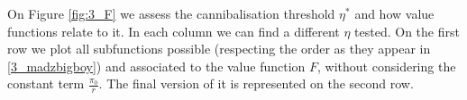 On Figure \ref{fig:3_F} we assess the cannibalisation threshold $\eta^*$ and how value functions relate to it. In each column we can find a different $\eta$ tested. On the first row we plot all subfunctions possible (respecting the order as they appear in \eqref{3_madzbigboy}) and associated to the value function $F$, without considering the constant term $\frac{\pi_0}{r}$. The final version of it is represented on the second row.



